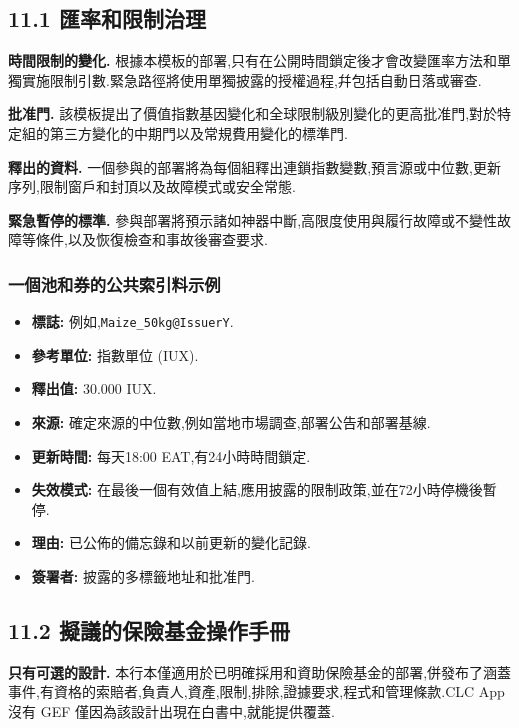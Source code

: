 \documentclass[11pt]{article}
\begin{document}
\subsection*{11.1 匯率和限制治理}

\textbf{時間限制的變化.} 根據本模板的部署,只有在公開時間鎖定後才會改變匯率方法和單獨實施限制引數.緊急路徑將使用單獨披露的授權過程,幷包括自動日落或審查.

\textbf{批准門.} 該模板提出了價值指數基因變化和全球限制級別變化的更高批准門,對於特定組的第三方變化的中期門以及常規費用變化的標準門.

\textbf{釋出的資料.} 一個參與的部署將為每個組釋出連鎖指數變數,預言源或中位數,更新序列,限制窗戶和封頂以及故障模式或安全常態.

\textbf{緊急暫停的標準.} 參與部署將預示諸如神器中斷,高限度使用與履行故障或不變性故障等條件,以及恢復檢查和事故後審查要求.

\subsubsection*{一個池和券的公共索引料示例}

\begin{itemize}[leftmargin=*]
\item \textbf{標誌:} 例如,\texttt{Maize\_50kg@IssuerY}.
\item \textbf{參考單位:} 指數單位 (IUX).
\item \textbf{釋出值:} 30.000 IUX.
\item \textbf{來源:} 確定來源的中位數,例如當地市場調查,部署公告和部署基線.
\item \textbf{更新時間:} 每天18:00 EAT,有24小時時間鎖定.
\item \textbf{失效模式:} 在最後一個有效值上結,應用披露的限制政策,並在72小時停機後暫停.
\item \textbf{理由:} 已公佈的備忘錄和以前更新的變化記錄.
\item \textbf{簽署者:} 披露的多標籤地址和批准門.
\end{itemize}
\subsection*{11.2 擬議的保險基金操作手冊}

\textbf{只有可選的設計.} 本行本僅適用於已明確採用和資助保險基金的部署,併發布了涵蓋事件,有資格的索賠者,負責人,資產,限制,排除,證據要求,程式和管理條款.CLC App 沒有 GEF 僅因為該設計出現在白書中,就能提供覆蓋.
\end{document}
